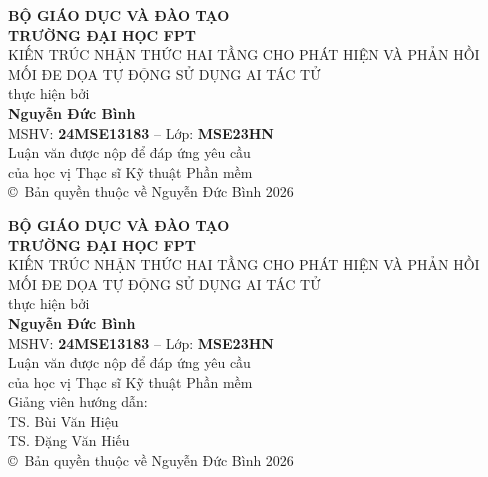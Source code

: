 \documentclass[12pt,a4paper]{report}
\begin{document}

\pagestyle{empty}

\begin{titlepage}
    \centering
    \vspace*{1cm}
    {\large\textbf{BỘ GIÁO DỤC VÀ ĐÀO TẠO}}\\[0.1cm]
    {\large\textbf{TRƯỜNG ĐẠI HỌC FPT}}\\[3cm]

    {\Large KIẾN TRÚC NHẬN THỨC HAI TẦNG CHO PHÁT HIỆN VÀ PHẢN HỒI MỐI ĐE DỌA TỰ ĐỘNG SỬ DỤNG AI TÁC TỬ}\\[2.5cm]

    thực hiện bởi\\[0.8cm]

    \textbf{Nguyễn Đức Bình}\\[0.3cm]
    MSHV: \textbf{24MSE13183} -- Lớp: \textbf{MSE23HN}\\[2.5cm]

    Luận văn được nộp để đáp ứng yêu cầu\\
    của học vị Thạc sĩ Kỹ thuật Phần mềm\\[1cm]

    \vfill
    {\normalsize \copyright\ Bản quyền thuộc về Nguyễn Đức Bình 2026}
\end{titlepage}

\begin{titlepage}
    \centering
    \vspace*{1cm}
    {\large\textbf{BỘ GIÁO DỤC VÀ ĐÀO TẠO}}\\[0.1cm]
    {\large\textbf{TRƯỜNG ĐẠI HỌC FPT}}\\[3cm]

    {\Large KIẾN TRÚC NHẬN THỨC HAI TẦNG CHO PHÁT HIỆN VÀ PHẢN HỒI MỐI ĐE DỌA TỰ ĐỘNG SỬ DỤNG AI TÁC TỬ}\\[2.5cm]

    thực hiện bởi\\[0.8cm]

    \textbf{Nguyễn Đức Bình}\\[0.3cm]
    MSHV: \textbf{24MSE13183} -- Lớp: \textbf{MSE23HN}\\[2.5cm]

    Luận văn được nộp để đáp ứng yêu cầu\\
    của học vị Thạc sĩ Kỹ thuật Phần mềm\\[1.5cm]

    Giảng viên hướng dẫn:\\
    TS. Bùi Văn Hiệu\\
    TS. Đặng Văn Hiếu\\[1cm]

    \vfill
    {\normalsize \copyright\ Bản quyền thuộc về Nguyễn Đức Bình 2026}
\end{titlepage}
\end{document}

